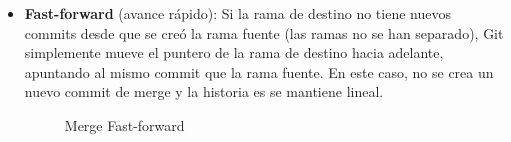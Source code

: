 \documentclass[a4paper,12pt]{report}
\begin{document}
\begin{itemize}
  \item \textbf{Fast-forward} (avance rápido):
    Si la rama de destino no tiene nuevos commits desde que se creó la rama fuente (las
    ramas no se han separado), Git simplemente mueve el puntero de la rama de destino hacia adelante,
    apuntando al mismo commit que la rama fuente. En este caso, no se crea un nuevo
    commit de merge y la historia es se mantiene lineal.

    \begin{figure}[h]
      \begin{subfigure}[b]{\textwidth}
        \centering
      \end{subfigure}
    
      \begin{subfigure}[b]{\textwidth}
        \centering
      \end{subfigure}
      \caption{Merge Fast-forward}
      \label{fig:merge_fast_forward}
    \end{figure}


\end{itemize}
\end{document}
